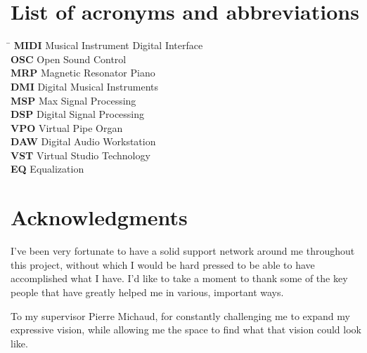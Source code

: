 \documentclass[12pt,twoside,maitrise]{dms_ks}
\theoremstyle{definition}
\begin{document}
\chapter*{List of acronyms and abbreviations}
\begin{tabbing}
    \hspace{2cm} \= \kill %
    \textbf{MIDI} \> Musical Instrument Digital Interface \\
    \textbf{OSC} \> Open Sound Control \\
    \textbf{MRP} \> Magnetic Resonator Piano \\
    \textbf{DMI} \> Digital Musical Instruments \\
    \textbf{MSP} \> Max Signal Processing \\
    \textbf{DSP} \> Digital Signal Processing \\
    \textbf{VPO} \> Virtual Pipe Organ \\
    \textbf{DAW} \> Digital Audio Workstation \\
    \textbf{VST} \> Virtual Studio Technology \\
    \textbf{EQ}  \> Equalization \\
\end{tabbing}


\chapter*{Acknowledgments}

I've been very fortunate to have a solid support network around me throughout this project, without which I would be hard pressed to be able to have accomplished what I have.
I'd like to take a moment to thank some of the key people that have greatly helped me in various, important ways.

To my supervisor Pierre Michaud, for constantly challenging me to expand my expressive vision, while allowing me the space to find what that vision could look like.
\end{document}
